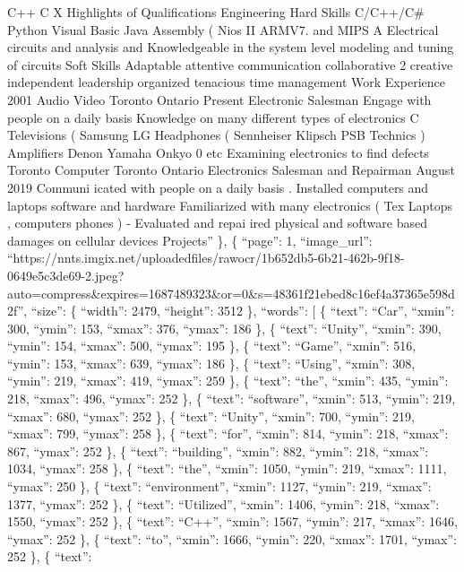 \documentclass[
]{article}
\begin{document}
C++ C X Highlights of Qualifications Engineering Hard Skills C/C++/C\#
Python Visual Basic Java Assembly ( Nios II ARMV7. and MIPS A \textbar{}
Electrical circuits and analysis and Knowledgeable in the system level
modeling and tuning of circuits Soft Skills Adaptable attentive
communication collaborative 2 creative independent leadership organized
\textbar{} tenacious time management Work Experience 2001 Audio Video
Toronto Ontario Present Electronic Salesman Engage with people on a
daily basis Knowledge on many different types of electronics C
Televisions ( Samsung \textbar{} LG \textbar{} Headphones ( Sennheiser
Klipsch \textbar{} PSB Technics ) Amplifiers Denon Yamaha Onkyo 0
\textbar{} etc Examining electronics to find defects Toronto Computer
Toronto Ontario Electronics Salesman and Repairman August 2019
\textbar{} Communi icated with people on a daily basis . Installed
computers and laptops software and hardware Familiarized with many
electronics ( Tex Laptops , computers \textbar{} phones ) - Evaluated
and repai ired physical and software based damages on cellular devices
Projects'' \}, \{ ``page'': 1, ``image\_url'':
``https://nnts.imgix.net/uploadedfiles/rawocr/1b652db5-6b21-462b-9f18-0649e5c3de69-2.jpeg?auto=compress\&expires=1687489323\&or=0\&s=48361f21ebed8c16ef4a37365e598d2f'',
``size'': \{ ``width'': 2479, ``height'': 3512 \}, ``words'': {[} \{
``text'': ``Car'', ``xmin'': 300, ``ymin'': 153, ``xmax'': 376,
``ymax'': 186 \}, \{ ``text'': ``Unity'', ``xmin'': 390, ``ymin'': 154,
``xmax'': 500, ``ymax'': 195 \}, \{ ``text'': ``Game'', ``xmin'': 516,
``ymin'': 153, ``xmax'': 639, ``ymax'': 186 \}, \{ ``text'': ``Using'',
``xmin'': 308, ``ymin'': 219, ``xmax'': 419, ``ymax'': 259 \}, \{
``text'': ``the'', ``xmin'': 435, ``ymin'': 218, ``xmax'': 496,
``ymax'': 252 \}, \{ ``text'': ``software'', ``xmin'': 513, ``ymin'':
219, ``xmax'': 680, ``ymax'': 252 \}, \{ ``text'': ``Unity'', ``xmin'':
700, ``ymin'': 219, ``xmax'': 799, ``ymax'': 258 \}, \{ ``text'':
``for'', ``xmin'': 814, ``ymin'': 218, ``xmax'': 867, ``ymax'': 252 \},
\{ ``text'': ``building'', ``xmin'': 882, ``ymin'': 218, ``xmax'': 1034,
``ymax'': 258 \}, \{ ``text'': ``the'', ``xmin'': 1050, ``ymin'': 219,
``xmax'': 1111, ``ymax'': 250 \}, \{ ``text'': ``environment'',
``xmin'': 1127, ``ymin'': 219, ``xmax'': 1377, ``ymax'': 252 \}, \{
``text'': ``Utilized'', ``xmin'': 1406, ``ymin'': 218, ``xmax'': 1550,
``ymax'': 252 \}, \{ ``text'': ``C++'', ``xmin'': 1567, ``ymin'': 217,
``xmax'': 1646, ``ymax'': 252 \}, \{ ``text'': ``to'', ``xmin'': 1666,
``ymin'': 220, ``xmax'': 1701, ``ymax'': 252 \}, \{ ``text'':
\end{document}
